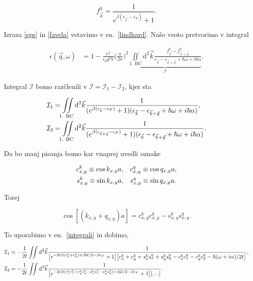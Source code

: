 \documentclass[a4paper, 12pt]{article}
\newcommand{\vq}{
	\ensuremath{\vec{q}}
}
\newcommand{\w}{
	\ensuremath{\omega}
}
\newcommand{\e}{
	\ensuremath{\epsilon}
}
\newcommand{\vk}{
	\ensuremath{\vec{k}}
}
\renewcommand{\ni}{
	\noindent
}
\newcommand{\pred}{
	\ensuremath{\frac{e^2}{\e_0 q^2 V}}
}
\newcommand{\dd}{
	\ensuremath{\text{d}}
}
\newcommand{\I}{
	\ensuremath{\mathcal{I}}
}
\begin{document}
\begin{equation}
	f_{\vk}^0 = \frac{1}{e^{\beta(\e_{\vk} - \e_F)} + 1}.
	\label{favela}
\end{equation}

\ni Izraza \eqref{eps} in \eqref{favela} vstavimo v en.~\eqref{lindhard}. Na\v so vsoto pretvorimo
v integral

\begin{align}
	\e(\vq, \w) &= 1 - \pred \Big(\frac{a}{2\pi}\Big)^2 \underbrace{ \iint\limits_\text{1. BC}\dd^2 \vk \frac{f^0_{\vk} -
		f^0_{\vk+\vq}}{\e_{\vk} - \e_{\vk+\vq} + \hbar\w + i\hbar\alpha}}_{\I}.
\end{align}

\ni Integral $\I$ bomo raz\v clenili v $\I = \I_1 - \I_2$, kjer sta

\begin{align}
	\I_1 &= \iint\limits_\text{1. BC}\dd^2 \vk \frac{1}{(e^{\beta(\e_{\vk} - \e_F)} + 1)
		(\e_{\vk} - \e_{\vk + \vq} + \hbar\w + i\hbar\alpha)}, \notag \\
	\I_2 &= \iint\limits_\text{1. BC}\dd^2 \vk \frac{1}{(e^{\beta(\e_{\vk+\vq} - \e_F)} + 1)
		(\e_{\vk} - \e_{\vk + \vq} + \hbar\w + i\hbar\alpha)}.
	\label{integrali}
\end{align}

\ni Da bo manj pisanja bomo kar vnaprej uvedli oznake

\begin{align}
	c_{x,y}^k \equiv \cos k_{x,y} a, &\quad	c_{x,y}^q \equiv \cos q_{x,y} a, \notag \\
	s_{x,y}^k \equiv \sin k_{x,y} a, &\quad s_{x,y}^q \equiv \sin q_{x,y} a.
\end{align}

\ni Torej

\begin{equation}
	\cos [(k_{x,y} + q_{x,y}) a] = c_{x,y}^k c_{x,y}^q - s_{x,y}^k s_{x,y}^q.
\end{equation}

\ni To uporabimo v en.~\eqref{integrali} in dobimo, 

\begin{align}
	\I_1 &= -\frac{1}{2t}\iint \dd^2 \vk \frac{1}
		{\big[e^{-2t\beta(c_x^k + c_y^k) + \beta\mathcal{U}/2 - \beta\e_F} + 1\big]
		\big[c_x^k + c_y^k + s_x^k s_x^q + s_y^k s_y^q - c_x^k c_x^q - c_y^k c_y^q -
		\hbar(\w + i\alpha)/2t\big]}, \notag \\
	\I_2 &= -\frac{1}{2t}\iint \dd^2 \vk \frac{1}
		{\big[e^{-2t\beta (c_x^k c_x^q + c_y^k c_y^q - s_x^k s_x^q - s_y^k s_y^q) + 
		\beta\mathcal{U}/2 - \beta\e_F} + 1\big][ \ldots ]}.
\end{align}
\end{document}
